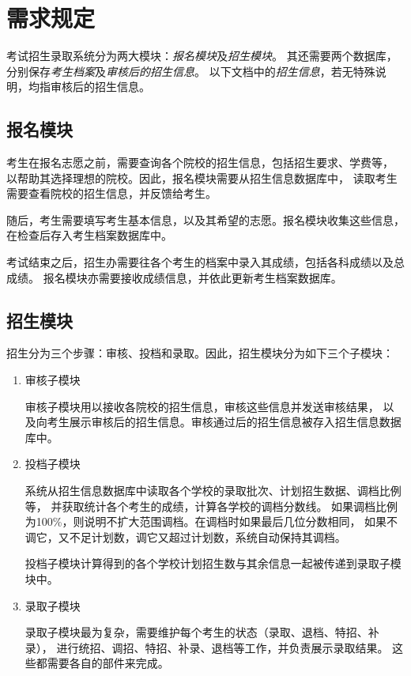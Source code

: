 \documentclass[CJK,utf8]{ctexrep}
\begin{document}
\section*{需求规定}

考试招生录取系统分为两大模块：\emph{报名模块}及\emph{招生模块}。
其还需要两个数据库，分别保存\emph{考生档案}及\emph{审核后的招生信息}。
以下文档中的\emph{招生信息}，若无特殊说明，均指审核后的招生信息。

\subsection*{报名模块}

考生在报名志愿之前，需要查询各个院校的招生信息，包括招生要求、学费等，
以帮助其选择理想的院校。因此，报名模块需要从招生信息数据库中，
读取考生需要查看院校的招生信息，并反馈给考生。

随后，考生需要填写考生基本信息，以及其希望的志愿。报名模块收集这些信息，
在检查后存入考生档案数据库中。

考试结束之后，招生办需要往各个考生的档案中录入其成绩，包括各科成绩以及总成绩。
报名模块亦需要接收成绩信息，并依此更新考生档案数据库。

\subsection*{招生模块}

招生分为三个步骤：审核、投档和录取。因此，招生模块分为如下三个子模块：

\begin{enumerate}
	\item 审核子模块
	
	审核子模块用以接收各院校的招生信息，审核这些信息并发送审核结果，
	以及向考生展示审核后的招生信息。审核通过后的招生信息被存入招生信息数据库中。
	
	\item 投档子模块
	
	系统从招生信息数据库中读取各个学校的录取批次、计划招生数据、调档比例等，
	并获取统计各个考生的成绩，计算各学校的调档分数线。
	如果调档比例为100\%，则说明不扩大范围调档。在调档时如果最后几位分数相同，
	如果不调它，又不足计划数，调它又超过计划数，系统自动保持其调档。
	
	投档子模块计算得到的各个学校计划招生数与其余信息一起被传递到录取子模块中。
	
	\item 录取子模块
	
	录取子模块最为复杂，需要维护每个考生的状态（录取、退档、特招、补录），
	进行统招、调招、特招、补录、退档等工作，并负责展示录取结果。
	这些都需要各自的部件来完成。
\end{enumerate}
\end{document}
